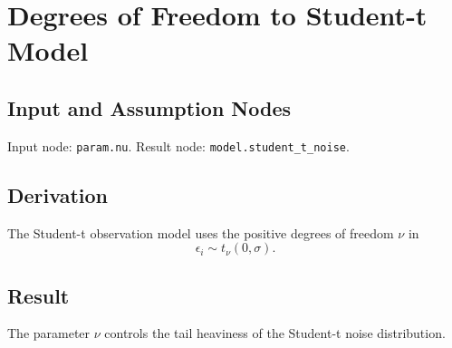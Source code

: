 \section{Degrees of Freedom to Student-t Model}
\label{edge:nu-to-student-t-model}

\subsection{Input and Assumption Nodes}
Input node: \texttt{param.nu}. Result node: \texttt{model.student\_t\_noise}.

\subsection{Derivation}
The Student-t observation model uses the positive degrees of freedom \(\nu\) in
\[
  \epsilon_i \sim t_\nu(0,\sigma).
\]

\subsection{Result}
The parameter \(\nu\) controls the tail heaviness of the Student-t noise distribution.
